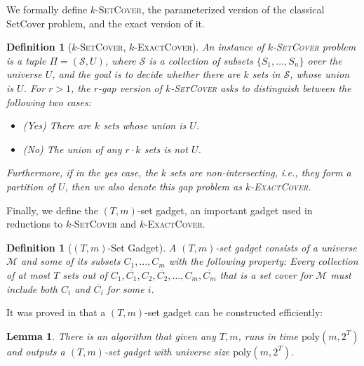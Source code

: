 \documentclass[10pt,a4paper]{article}
\newtheorem{definition}[theorem]{Definition}
\newtheorem{lemma}[theorem]{Lemma}
\newcommand{\kexact}{\textsc{$k$-ExactCover}}
\newcommand{\ksetcover}{\textsc{$k$-SetCover}}
\begin{document}
We formally define \ksetcover{}, the parameterized version of the classical {\sc SetCover} problem, and the exact version of it. 
\begin{definition}[\ksetcover{}, \kexact{}]
    An instance of \ksetcover{} problem is a tuple $\Pi=(\mathcal S,U)$, where $\mathcal S$ is a collection of subsets $\{S_1,\ldots,S_n\}$ over the universe $U$, and the goal is to decide whether there are $k$ sets in $\mathcal S$, whose union is $U$. For $r>1$, the $r$-gap version of \ksetcover{} asks to distinguish between the following two cases:
    \begin{itemize}
        \item (Yes) There are $k$ sets whose union is $U$.
        \item (No) The union of any $r\cdot k$ sets is not $U$.
    \end{itemize}
    Furthermore, if in the yes case, the $k$ sets are non-intersecting, i.e., they form a partition of $U$, then we also denote this gap problem as \kexact{}.
\end{definition}

Finally, we define the $(T,m)$-set gadget, an important gadget used in reductions to \ksetcover{} and \kexact{}.

\begin{definition}[$(T,m)$-Set Gadget]
    A $(T,m)$-set gadget consists of a universe $\mathcal M$ and some of its subsets $C_1,\ldots,C_{m}$ with the following property: Every collection of at most $T$ sets out of $C_1,\overline {C_1},C_2,\overline{C_2},\ldots,C_m,\overline{C_m}$ that is a set cover for $\mathcal M$ must include both $C_i$ and $\overline{C_i}$ for some $i$.
\end{definition}

It was proved in \cite{LY94} that a $(T,m)$-set gadget can be constructed efficiently:

\begin{lemma}
\label{lem:construct-set-gadget}
    There is an algorithm that given any $T,m$, runs in time $\text{poly}(m,2^T)$ and outputs a $(T,m)$-set gadget with universe size $\text{poly}(m,2^T)$.
\end{lemma}

\end{document}
